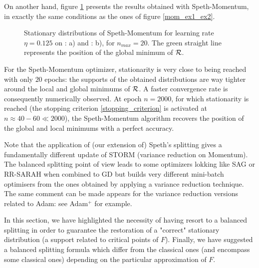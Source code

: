 \begin{remark}
  On another hand, figure \ref{speth_mom_ex1_ex2} presents the results obtained with Speth-Momentum, in exactly the same conditions as the ones of figure \ref{mom_ex1_ex2}. 
\begin{figure}[!h]
	\centering
	  \scalebox{0.45}{}
	\scalebox{0.45}{}
        \caption{Stationary distributions of Speth-Momentum for learning rate $\eta=0.125$ on \exOne: a) and \exTwo: b), for $n_{max}=20$. The green straight line represents the position of the global minimum of $\mathcal{R}$.}
	\label{speth_mom_ex1_ex2}
\end{figure}
For the Speth-Momentum optimizer, stationarity is very close to being reached with only $20$ epochs: the supports of the obtained distributions are way tighter around the local and
global minimums of $\mathcal{R}$. A faster convergence rate is consequently numerically observed.  
  At epoch $n=2000$, for which stationarity is reached (the stopping criterion \eqref{stopping_criterion} is activated at $n\approx 40 - 60 \ll 2000$), the Speth-Momentum algorithm recovers the 
  position of the global and local minimums with a perfect accuracy. 

        Note that the application of (our extension of) Speth's splitting gives a fundamentally different update of STORM (variance reduction on Momentum). 
        The balanced splitting point of view leads to some optimizers lokking like SAG or RR-SARAH when combined to GD but builds 
        very different mini-batch optimisers from the ones obtained by applying a variance reduction technique. 
        The same comment can be made appears for the variance reduction versions related to Adam: see Adam$^+$ \cite{adam_variance1} for example.


\end{remark}

\begin{remark}
\end{remark}


In this section, we have highlighted the necessity of having resort to a balanced splitting in order to guarantee the restoration of a "correct" stationary distribution (a support related to critical
points of $F$). Finally, we have suggested a balanced splitting formula which differ from the classical ones (and encompass some classical ones) %
depending on the particular approximation of $F$. 
\ \\ \ \\

